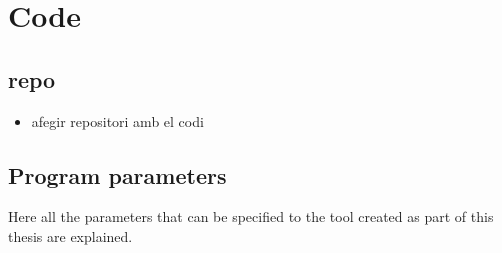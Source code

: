 \chapter{Code}
\label{cha:code}

\section{repo}
\begin{itemize}
\item afegir repositori amb el codi
\end{itemize}

\section{Program parameters}
\label{sec:app_code_program-parameters}

Here all the parameters that can be specified to the tool created as part of this thesis are explained.

